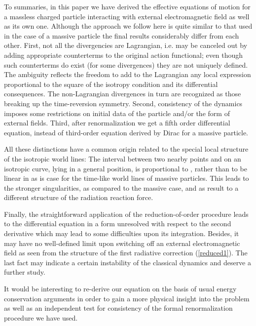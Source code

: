\documentclass[a4paper,12pt]{article}
\begin{document}
To summaries, in this paper we have derived the effective
equations of motion for a massless charged particle interacting
with external electromagnetic field as well as its own one.
Although the approach we follow here is quite similar to that
used in the case of a massive particle \cite{KLS} the final
results considerably differ from each other. First, not all the
divergencies are Lagrangian, i.e. may be canceled out by adding
appropriate counterterms to the original action functional; even
though such counterterms do exist (for some divergences) they are
not uniquely defined. The ambiguity reflects the freedom to add to
the Lagrangian any local expression proportional to the square of
the isotropy condition and its differential consequences. The
non-Lagrangian divergences in turn are recognized as those
breaking up the time-reversion symmetry. Second, consistency of
the dynamics imposes some restrictions on initial data of the
particle and/or the form of external fields. Third, after
renormalization we get a fifth order differential equation,
instead of third-order equation derived by Dirac for a massive
particle.

All these distinctions have a common origin related to the special
local structure of the isotropic world lines: The interval
between two nearby points \coordHE{} and \coordHE{} on
an isotropic curve, lying in a general position, is proportional
to \coordHE{}, rather than to be linear in \myHighlight{$\delta \tau$}\coordHE{} as is
case for the time-like world lines of massive particles. This
leads to the stronger singularities, as compared to the massive
case, and as result to a different structure of the radiation
reaction force.




Finally, the straightforward application of the
reduction-of-order procedure leads to the differential equation in
a form unresolved with respect to the second derivative which may
lead to some difficulties upon its integration. Besides, it may
have no well-defined limit upon switching off an external
electromagnetic field as seen from the structure of the first
radiative correction (\ref{reduced1}). The last fact may indicate
a certain instability of the classical dynamics and deserve a
further study.


It would be interesting to re-derive our equation on the basis of
usual energy conservation arguments in order to gain a more
physical insight into the problem as well as an independent test
for consistency of the formal renormalization procedure we have
used.
\end{document}
